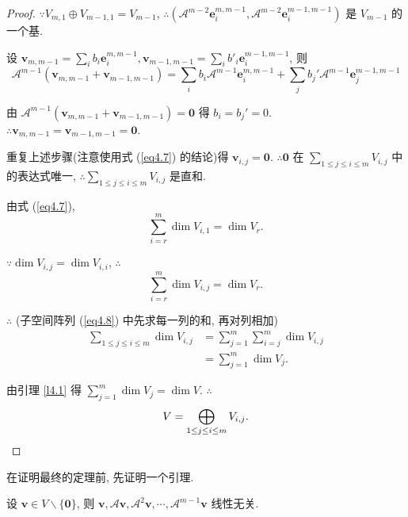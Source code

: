 \documentclass{ctexart}
\begin{document}
\begin{proof}
    $\because V_{m,1}\oplus V_{m-1,1}=V_{m-1}$, $\therefore(\mathcal{A}^{m-2}\boldsymbol{e}_i^{m,m-1},\mathcal{A}^{m-2}\boldsymbol{e}_i^{m-1,m-1})$ 是 $V_{m-1}$ 的一个基.

    设 $\boldsymbol{v}_{m,m-1}=\sum\limits_ib_i\boldsymbol{e}_i^{m,m-1},\boldsymbol{v}_{m-1,m-1}=\sum\limits_ib'_i\boldsymbol{e}_i^{m-1,m-1}$, 则
    \[\mathcal{A}^{m-1}(\boldsymbol{v}_{m,m-1}+\boldsymbol{v}_{m-1,m-1})=\sum\limits_ib_i\mathcal{A}^{m-1}\boldsymbol{e}_i^{m,m-1}+\sum\limits_jb_j'\mathcal{A}^{m-1}\boldsymbol{e}_j^{m-1,m-1}\]
    
    由 $\mathcal{A}^{m-1}(\boldsymbol{v}_{m,m-1}+\boldsymbol{v}_{m-1,m-1})=\boldsymbol{0}$ 得 $b_i=b_j'=0$. $\therefore\boldsymbol{v}_{m,m-1}=\boldsymbol{v}_{m-1,m-1}=\boldsymbol{0}$.

    重复上述步骤(注意使用式 (\ref{eq4.7}) 的结论)得 $\boldsymbol{v}_{i,j}=\boldsymbol{0}$. $\therefore\boldsymbol{0}$ 在 $\sum\limits_{1\leq j\leq i\leq m}V_{i,j}$ 中的表达式唯一, $\therefore\sum\limits_{1\leq j\leq i\leq m}V_{i,j}$ 是直和.

    由式 (\ref{eq4.7}),
    \[\sum\limits_{i=r}^m\dim V_{i,1}=\dim V_r.\]

    $\because\dim V_{i,j}=\dim V_{i,i}$, $\therefore$
    \[\sum\limits_{i=r}^m\dim V_{i,j}=\dim V_r.\]

    $\therefore$ (子空间阵列 (\ref{eq4.8}) 中先求每一列的和, 再对列相加)
    \begin{align*}
        \sum\limits_{1\leq j\leq i\leq m}\dim V_{i,j} & =\sum\limits_{j=1}^m\sum\limits_{i=j}^m\dim V_{i,j} \\
        & =\sum\limits_{j=1}^m\dim V_j.
    \end{align*}

    由引理 \ref{l4.1} 得 $\sum\limits_{j=1}^m\dim V_j=\dim V$. $\therefore$
    \[V=\bigoplus\limits_{1\leq j\leq i\leq m}V_{i,j}.\qedhere\]
\end{proof}
在证明最终的定理前, 先证明一个引理.
\begin{lemma}\label{l4.2}
    设 $\boldsymbol{v}\in V\backslash\{\boldsymbol{0}\}$, 则 $\boldsymbol{v},\mathcal{A}\boldsymbol{v},\mathcal{A}^2\boldsymbol{v},\cdots,\mathcal{A}^{m-1}\boldsymbol{v}$ 线性无关.
\end{lemma}
\end{document}
